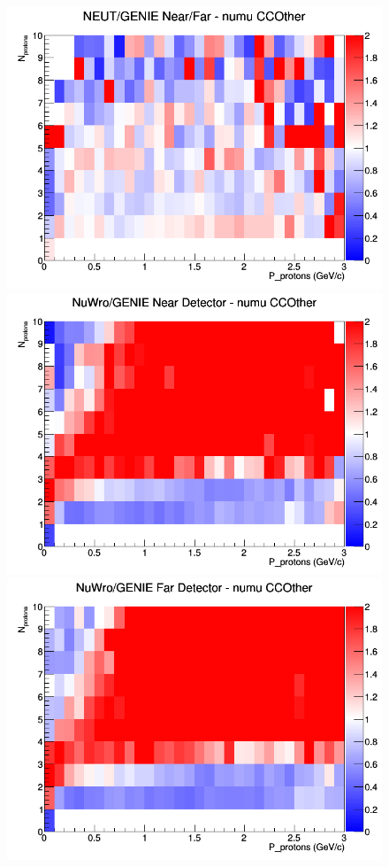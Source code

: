 \documentclass[12pt]{article}
\begin{document}
\begin{figure}[h]
\endminipage
{}
\includegraphics[width=\linewidth]{N_P/nominal/protons/ratios/CCOther_NEUT_GENIE_numu_NF_N_P.png}
\endminipage
\newline
{}
\includegraphics[width=\linewidth]{N_P/nominal/protons/ratios/CCOther_NuWro_GENIE_numu_near_N_P.png}
\endminipage
{}
\includegraphics[width=\linewidth]{N_P/nominal/protons/ratios/CCOther_NuWro_GENIE_numu_far_N_P.png}

\end{figure}
\end{document}
